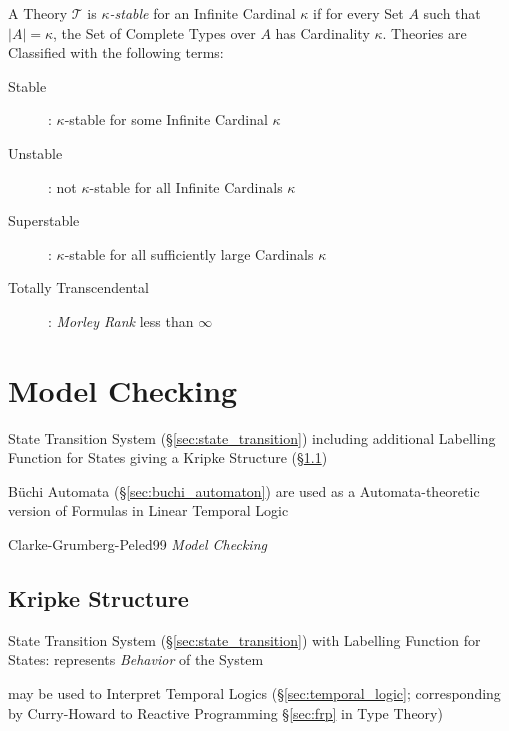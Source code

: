 A Theory $\mathcal{T}$ is \emph{$\kappa$-stable} for an Infinite
Cardinal $\kappa$ if for every Set $A$ such that $|A| = \kappa$, the
Set of Complete Types over $A$ has Cardinality $\kappa$. Theories are
Classified with the following terms:
\begin{description}
\item [Stable]: $\kappa$-stable for some Infinite Cardinal $\kappa$
\item [Unstable]: not $\kappa$-stable for all Infinite Cardinals
  $\kappa$
\item [Superstable]: $\kappa$-stable for all sufficiently large
  Cardinals $\kappa$
\item [Totally Transcendental]: \emph{Morley Rank}\cite{morley65} less
  than $\infty$
\end{description}



\section{Model Checking}\label{sec:model_checking}

State Transition System (\S\ref{sec:state_transition}) including
additional Labelling Function for States giving a Kripke Structure
(\S\ref{sec:kripke_structure})

B\"uchi Automata (\S\ref{sec:buchi_automaton}) are used as a
Automata-theoretic version of Formulas in Linear Temporal Logic

Clarke-Grumberg-Peled99 \emph{Model Checking}



\subsection{Kripke Structure}\label{sec:kripke_structure}

State Transition System (\S\ref{sec:state_transition}) with Labelling
Function for States: represents \emph{Behavior} of the System


may be used to Interpret Temporal Logics (\S\ref{sec:temporal_logic};
corresponding by Curry-Howard to Reactive Programming \S\ref{sec:frp}
in Type Theory)



